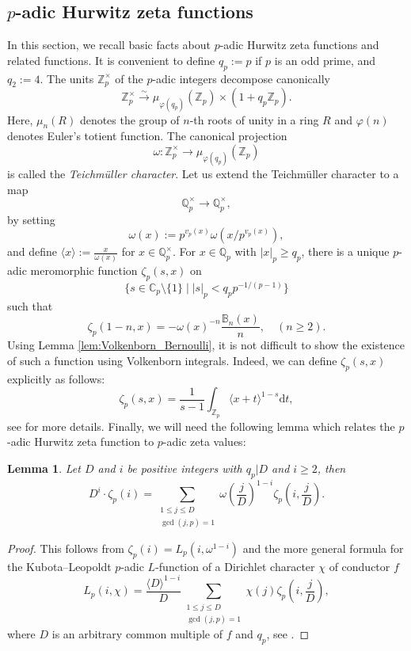 \documentclass[12pt]{article}
\newtheorem{lemma}[theorem]{Lemma}
\numberwithin{equation}{section}
\begin{document}
\subsection{$p$-adic Hurwitz zeta functions}
In this section, we recall basic facts about $p$-adic Hurwitz zeta functions and related functions.
It is convenient to define $q_p:=p$ if $p$ is an odd prime, and $q_2:=4$. The units $\mathbb{Z}_p^\times$ of the $p$-adic integers decompose canonically
\[
	\mathbb{Z}_p^\times \xrightarrow{\sim} \mu_{\varphi(q_p)}(\mathbb{Z}_p)\times (1+q_p\mathbb{Z}_p).
\]
Here, $\mu_n(R)$ denotes the group of $n$-th roots of unity in a ring $R$ and $\varphi(n)$ denotes Euler's totient function. The canonical projection
\[
	\omega \colon \mathbb{Z}_p^\times \rightarrow \mu_{\varphi(q_p)}(\mathbb{Z}_p)
\]
is called the \emph{Teichm\"uller character}. Let us extend the Teichm\"uller character to a map
\[
	\mathbb{Q}_p^\times\rightarrow \mathbb{Q}_p^\times,
\]
 by setting
\[
	\omega(x):=p^{v_p(x)}\omega(x/p^{v_p(x)}),
\]
and define $\langle x\rangle:=\frac{x}{\omega(x)}$ for $x\in\mathbb{Q}_p^\times$. For $x\in\mathbb{Q}_p$ with $|x|_p\geqslant q_p$, there is a unique $p$-adic meromorphic function $\zeta_p(s,x)$ on
\[
	\{s\in\mathbb{C}_p\setminus\{1\} \mid |s|_p<q_p p^{-1/(p-1)}\}
\]
such that 
\[
	\zeta_p(1-n,x)=-\omega(x)^{-n}\frac{\mathbb{B}_n(x)}{n}, \quad (n\geqslant 2).
\]
Using Lemma \ref{lem:Volkenborn_Bernoulli}, it is not difficult to show the existence of such a function using Volkenborn integrals. Indeed, we can define $\zeta_p(s,x)$ explicitly as follows:
\begin{equation}\label{eq:zeta_Volkenborn}
	\zeta_p(s,x)=\frac{1}{s-1}\int_{\mathbb{Z}_p}\langle x+t\rangle^{1-s}\mathrm{d}t,
\end{equation}
see \cite[Def. 11.2.5]{Coh07} for more details. Finally, we will need the following lemma which relates the $p$-adic Hurwitz zeta function to $p$-adic zeta values:
\begin{lemma}\label{lem:padicHurwitz_zeta}
    Let $D$ and $i$ be positive integers with $q_p|D$ and $i\geqslant 2$, then
    \[
        D^i\cdot \zeta_p(i)=\sum_{\substack{1\leqslant j\leqslant D \\ \gcd(j,p)=1 }} \omega\left(\frac{j}{D}\right)^{1-i}\zeta_p\left(i,\frac{j}{D}\right).
    \]
\end{lemma}
\begin{proof}
    This follows from $\zeta_p(i)=L_p(i,\omega^{1-i})$ and the more general formula for the Kubota--Leopoldt $p$-adic $L$-function of a Dirichlet character $\chi$ of conductor $f$
    \[
    L_p(i,\chi)=\frac{\langle D \rangle^{1-i}}{D} \sum_{\substack{1\leqslant j\leqslant D \\ \gcd(j,p)=1 }} \chi(j)\zeta_p\left(i,\frac{j}{D}\right),
    \]
    where $D$ is an arbitrary common multiple of $f$ and $q_p$, see \cite[Prop. 11.3.8.(1)]{Coh07}.
\end{proof}
\end{document}
